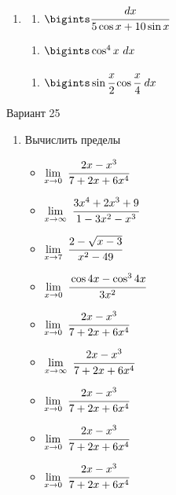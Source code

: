 \documentclass{article}
\begin{document}
\begin{multicols}{2}
\begin{enumerate}[label=\Roman*.]
	\item
	\begin{multicols}{3}
		\begin{enumerate}[label=\arabic*.]
			\setlength\itemsep{1em}
			\item $\bigints\cfrac{dx}{5\cos x + 10 \sin x}$
		\end{enumerate}
		\vfill\null\columnbreak
		\begin{enumerate}[label=\arabic*., start=2]
			\setlength\itemsep{1em}
			\item $\bigints\cos^4x\ dx$
		\end{enumerate}
		\vfill\null\columnbreak
		\begin{enumerate}[label=\arabic*., start=3]
			\setlength\itemsep{1em}
			\item $\bigints\sin\cfrac{x}{2}\cos\cfrac{x}{4}\ dx$
		\end{enumerate}
		\vfill\null\columnbreak
	\end{multicols}
\end{enumerate}

\vfill\null\columnbreak

\centerline{Вариант 25}

\begin{enumerate}[label=\arabic*.]
	\item Вычислить пределы
	\begin{multicols}{3}
		\begin{itemize}[label=""]
			\setlength\itemsep{0.7em}
			\item $\lim\limits_{x \to 0}\ \cfrac{2x - x^3}{7+2x+6x^4}$
			\item $\lim\limits_{x \to \infty}\ \cfrac{3x^4 + 2x^3 + 9}{1-3x^2-x^3}$
			\item $\lim\limits_{x \to 7}\ \cfrac{2-\sqrt{x-3}}{x^2-49}$
		\end{itemize}
		\vfill\null\columnbreak
		\begin{itemize}[label=""]
			\setlength\itemsep{0.7em}
			\item $\lim\limits_{x \to 0}\ \cfrac{\cos 4x - \cos^3 4x}{3x^2}$
			\item $\lim\limits_{x \to 0}\ \cfrac{2x - x^3}{7+2x+6x^4}$
			\item $\lim\limits_{x \to \infty}\ \cfrac{2x - x^3}{7+2x+6x^4}$
		\end{itemize}
		\vfill\null\columnbreak
		\begin{itemize}[label=""]
			\setlength\itemsep{0.7em}
			\item $\lim\limits_{x \to 0}\ \cfrac{2x - x^3}{7+2x+6x^4}$
			\item $\lim\limits_{x \to 0}\ \cfrac{2x - x^3}{7+2x+6x^4}$
			\item $\lim\limits_{x \to 0}\ \cfrac{2x - x^3}{7+2x+6x^4}$
		\end{itemize}
		\vfill\null\columnbreak
	\end{multicols}
	
\end{enumerate}	

\end{multicols}
 
\end{document}
